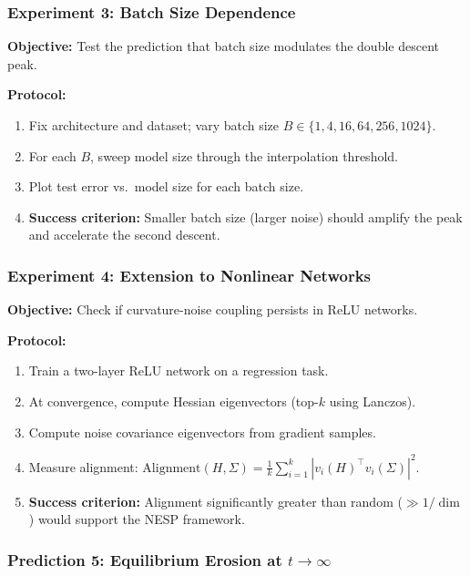\documentclass[
  journal=largetwo,
  year=2025,
  volume=37,
]{cup-journal}
\begin{document}
\subsubsection{Experiment 3: Batch Size Dependence}

\textbf{Objective:} Test the prediction that batch size modulates the double descent peak.

\textbf{Protocol:}
\begin{enumerate}
    \item Fix architecture and dataset; vary batch size $B \in \{1, 4, 16, 64, 256, 1024\}$.
    \item For each $B$, sweep model size through the interpolation threshold.
    \item Plot test error vs.\ model size for each batch size.
    \item \textbf{Success criterion:} Smaller batch size (larger noise) should amplify the peak and accelerate the second descent.
\end{enumerate}

\subsubsection{Experiment 4: Extension to Nonlinear Networks}

\textbf{Objective:} Check if curvature-noise coupling persists in ReLU networks.

\textbf{Protocol:}
\begin{enumerate}
    \item Train a two-layer ReLU network on a regression task.
    \item At convergence, compute Hessian eigenvectors (top-$k$ using Lanczos).
    \item Compute noise covariance eigenvectors from gradient samples.
    \item Measure alignment: $\text{Alignment}(H, \Sigma) = \frac{1}{k} \sum_{i=1}^{k} |v_i(H)^\top v_i(\Sigma)|^2$.
    \item \textbf{Success criterion:} Alignment significantly greater than random ($\gg 1/\dim$) would support the NESP framework.
\end{enumerate}

\subsubsection{Prediction 5: Equilibrium Erosion at $t \to \infty$}
\label{sec:equilibrium_erosion}
\end{document}
